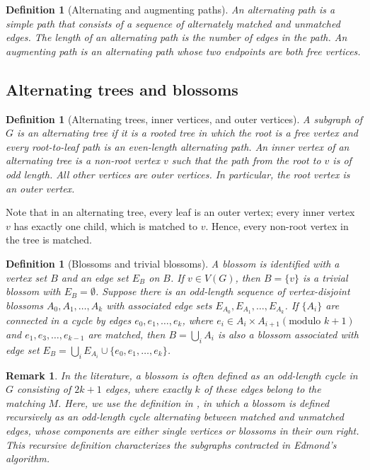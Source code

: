 \documentclass{article}
\newtheorem{definition}[theorem]{Definition}
\newtheorem{remark}{Remark}
\begin{document}
\begin{definition}[Alternating and augmenting paths] An \emph{alternating path} is a simple path that consists of a sequence of alternately matched and unmatched edges. The \emph{length} of an alternating path is the number of edges in the path. An \emph{augmenting path} is an alternating path whose two endpoints are both free vertices.
\end{definition}


\subsection{Alternating trees and blossoms}

\begin{definition}[Alternating trees, inner vertices, and outer vertices]
\label{def:alternating-tree}
A subgraph of $G$ is an \emph{alternating tree} if it is a rooted tree in which the root is a free vertex and every root-to-leaf path is an even-length alternating path.
An \emph{inner vertex} of an alternating tree is a non-root vertex $v$ such that the path from the root to $v$ is of odd length.
All other vertices are \emph{outer vertices}.
In particular, the root vertex is an outer vertex.
\end{definition}

Note that in an alternating tree, every leaf is an outer vertex; every inner vertex $v$ has exactly one child, which is matched to $v$. Hence, every non-root vertex in the tree is matched.

\begin{definition}[Blossoms and trivial blossoms]
\label{def:blossom}
A blossom is identified with a vertex set $B$ and an edge set $E_B$ on $B$.
If $v \in V(G)$, then $B = \{v\}$ is a \emph{trivial blossom} with $E_B = \emptyset$.
Suppose there is an odd-length sequence of vertex-disjoint blossoms $A_0, A_1, \dots , A_k$ with associated edge sets $E_{A_0}, E_{A_1}, \dots, E_{A_k}$.
If $\{A_i\}$ are connected in a cycle by edges $e_0, e_1, \dots , e_k$, where $e_i \in A_i \times A_{i+1} (\mbox{modulo } k+1)$ and $e_1, e_3, \dots, e_{k-1}$ are matched, then $B = \bigcup_{i} A_i$ is also a blossom associated with edge set $E_B = \bigcup_i E_{A_i} \cup \{e_0, e_1, \dots , e_k\}$.
\end{definition}

\begin{remark}
In the literature, a blossom is often defined as an odd-length cycle in $G$ consisting of $2k+1$ edges, where exactly $k$ of these edges belong to the matching $M$.
Here, we use the definition in \cite{DP14}, in which a blossom is defined recursively as an odd-length cycle alternating between matched and unmatched edges, whose components are either single vertices or blossoms in their own right.
This recursive definition characterizes the subgraphs contracted in Edmond's algorithm.
\end{remark}
\end{document}
